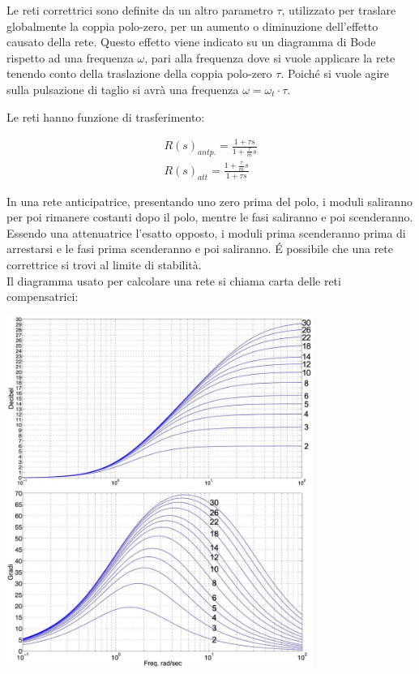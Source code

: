\documentclass{article}
\numberwithin{equation}{subsection}
\begin{document}
Le reti correttrici sono definite da un altro parametro $\tau$, utilizzato per traslare globalmente la coppia polo-zero, per un aumento o diminuzione dell'effetto 
causato della rete. Questo effetto viene indicato su un diagramma di Bode rispetto ad una frequenza $\omega$, pari alla frequenza dove si vuole applicare la rete tenendo 
conto della traslazione della coppia polo-zero $\tau$. Poiché si vuole agire sulla pulsazione di taglio si avrà una frequenza $\omega=\omega_t\cdot\tau$. 

Le reti hanno funzione di trasferimento: 

\begin{gather}
    R(s)_{antp.}=\displaystyle\frac{1+\tau s}{1+\displaystyle\frac{\tau}{m}s}\\
    R(s)_{att}=\displaystyle\frac{1+\displaystyle\frac{\tau}{m}s}{1+\tau s}
\end{gather}

In una rete anticipatrice, presentando uno zero prima del polo, i moduli saliranno per poi rimanere costanti dopo il polo, mentre le fasi saliranno e poi scenderanno. Essendo 
una attenuatrice l'esatto opposto, i moduli prima scenderanno prima di arrestarsi e le fasi prima scenderanno e poi saliranno. 
\'{E} possibile che una rete correttrice si trovi al limite di stabilità. \\

Il diagramma usato per calcolare una rete si chiama carta delle reti compensatrici: 

\begin{center}
    \includegraphics[width=10cm]{CartaReti.jpg}
\end{center}
\end{document}
